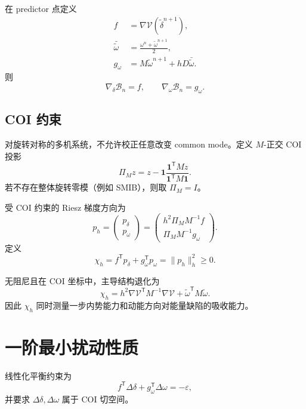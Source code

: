 \documentclass[UTF8,11pt,a4paper]{ctexart}
\theoremstyle{definition}
\theoremstyle{remark}
\newcommand{\T}{\mathsf{T}}
\newcommand{\one}{\bm 1}
\newcommand{\V}{\mathcal V}
\newcommand{\B}{\mathcal B}
\newcommand{\wt}{\widetilde}
\begin{document}
在 predictor 点定义
\begin{align}
 f&=\nabla\V(\wt\delta^{n+1}),\\
 \bar{\wt\omega}
 &=\frac{\omega^n+\wt\omega^{n+1}}2,\\
 g_\omega
 &=M\wt\omega^{n+1}+hD\bar{\wt\omega}.
 \label{eq:gomega}
\end{align}
则
\[
 \nabla_\delta\B_n=f,
 \qquad
 \nabla_\omega\B_n=g_\omega.
\]

\subsection{COI 约束}

对旋转对称的多机系统，不允许校正任意改变 common mode。定义
\(M\)-正交 COI 投影
\begin{equation}
 \Pi_M z
 =
 z-\one
 \frac{\one^\T Mz}{\one^\T M\one}.
 \label{eq:coi-projection}
\end{equation}
若不存在整体旋转零模（例如 SMIB），则取 \(\Pi_M=I\)。

受 COI 约束的 Riesz 梯度方向为
\begin{equation}
 \boxed{
 p_h=
 \begin{pmatrix}
 p_\delta\\
 p_\omega
 \end{pmatrix}
 =
 \begin{pmatrix}
 h^2\Pi_M M^{-1}f\\
 \Pi_M M^{-1}g_\omega
 \end{pmatrix}.}
 \label{eq:projection-direction}
\end{equation}
定义
\begin{equation}
 \boxed{
 \chi_h
 =
 f^\T p_\delta+g_\omega^\T p_\omega
 =
 \|p_h\|_h^2\ge0.}
 \label{eq:chi}
\end{equation}

无阻尼且在 COI 坐标中，主导结构退化为
\[
 \chi_h
 =
 h^2\nabla\V^\T M^{-1}\nabla\V
 +
 \wt\omega^\T M\wt\omega.
\]
因此 \(\chi_h\) 同时测量一步内势能力和动能方向对能量缺陷的吸收能力。

\section{一阶最小扰动性质}

线性化平衡约束为
\begin{equation}
 f^\T\Delta\delta
 +
 g_\omega^\T\Delta\omega
 =
 -\varepsilon,
 \label{eq:linearized-balance}
\end{equation}
并要求
\(
 \Delta\delta,\Delta\omega
\)
属于 COI 切空间。
\end{document}
